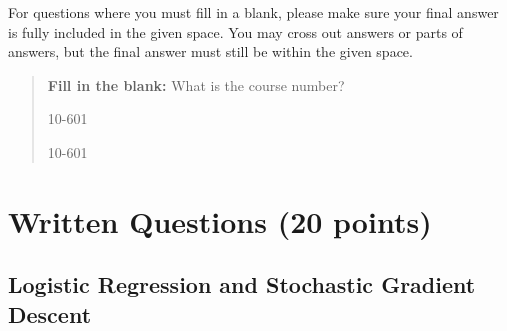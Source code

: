 \documentclass[11pt,addpoints,answers]{exam}
\begin{document}
For questions where you must fill in a blank, please make sure your final answer is fully included in the given space. You may cross out answers or parts of answers, but the final answer must still be within the given space.

\begin{quote}
\textbf{Fill in the blank:} What is the course number?

\begin{tcolorbox}[fit,height=1cm, width=4cm, blank, borderline={1pt}{-2pt},nobeforeafter]
    \begin{center}\huge10-601\end{center}
    \end{tcolorbox}\hspace{2cm}
    \begin{tcolorbox}[fit,height=1cm, width=4cm, blank, borderline={1pt}{-2pt},nobeforeafter]
    \begin{center}\huge10-601\end{center}
    \end{tcolorbox}
\end{quote}

\clearpage
\clearpage

\section{Written Questions (20 points)}

\subsection{Logistic Regression and Stochastic Gradient Descent}
\end{document}
